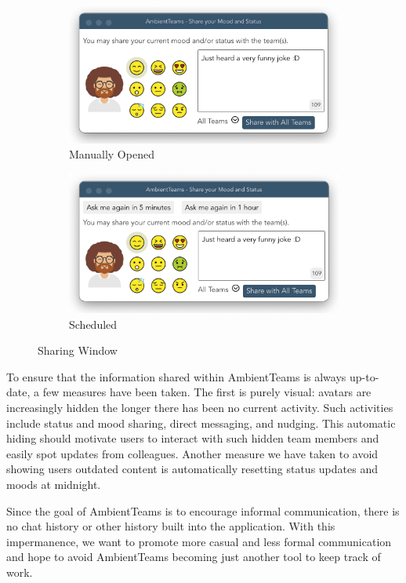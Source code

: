 \begin{figure}[h]
    \centering
    \begin{subfigure}{.5\textwidth}
        \centering
        \includegraphics[width=.8\linewidth]{./images/sharing_manual.png}
        \caption{Manually Opened}
        \label{fig:sharing_manual}
    \end{subfigure}%
    \begin{subfigure}{.5\textwidth}
        \centering
        \includegraphics[width=.8\linewidth]{./images/sharing_auto.png}
        \caption{Scheduled}
        \label{fig:sharing_auto}
    \end{subfigure}
    \caption{Sharing Window}
\end{figure}

To ensure that the information shared within AmbientTeams is always up-to-date, a few measures have been taken. The first is purely visual: avatars are increasingly hidden the longer there has been no current activity. Such activities include status and mood sharing, direct messaging, and nudging. This automatic hiding should motivate users to interact with such hidden team members and easily spot updates from colleagues. Another measure we have taken to avoid showing users outdated content is automatically resetting status updates and moods at midnight.

Since the goal of AmbientTeams is to encourage informal communication, there is no chat history or other history built into the application. With this impermanence, we want to promote more casual and less formal communication and hope to avoid AmbientTeams becoming just another tool to keep track of work.

